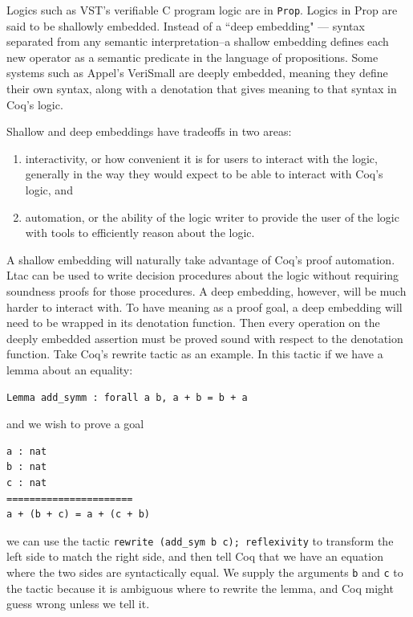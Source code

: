 \documentclass{puthesis}
\begin{document}
Logics such as VST's verifiable C program logic are in
\lstinline|Prop|. Logics in Prop are said to be shallowly embedded.
Instead of a ``deep embedding" --- syntax separated from any semantic
interpretation--a shallow embedding defines each new operator as a
semantic predicate in the language of propositions.  Some systems such
as Appel's VeriSmall \cite{appel11:cpp} are deeply embedded, meaning
they define their own syntax, along with a denotation that gives
meaning to that syntax in Coq's logic.

Shallow and deep embeddings have tradeoffs in two areas:

\begin{enumerate}
\item interactivity, or how convenient it is for users to interact
  with the logic, generally in the way they would expect to be able to
  interact with Coq's logic, and
\item automation, or the ability of the logic writer to provide the
  user of the logic with tools to efficiently reason about the logic.
\end{enumerate}

A shallow embedding will naturally take advantage of Coq's proof
automation. Ltac can be used to write decision procedures about the
logic without requiring soundness proofs for those procedures. A deep
embedding, however, will be much harder to interact with. To have
meaning as a proof goal, a deep embedding will need to be wrapped in
its denotation function. Then every operation on the deeply embedded
assertion must be proved sound with respect to the denotation
function. Take Coq's rewrite tactic as an example. In this tactic if
we have a lemma about an equality:

\begin{verbatim}
Lemma add_symm : forall a b, a + b = b + a
\end{verbatim}

and we wish to prove a goal 

\begin{verbatim}
a : nat
b : nat
c : nat
======================
a + (b + c) = a + (c + b) 
\end{verbatim}

we can use the tactic \lstinline|rewrite (add_sym b c); reflexivity|
to transform the left side to match the right side, and then tell Coq
that we have an equation where the two sides are syntactically
equal. We supply the arguments \lstinline|b| and \lstinline|c| to the
tactic because it is ambiguous where to rewrite the lemma, and Coq
might guess wrong unless we tell it.
\end{document}
